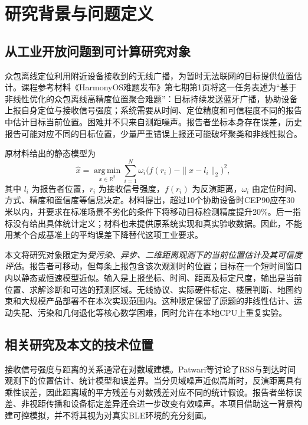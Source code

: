 \section{研究背景与问题定义}
\label{sec:background}

\subsection{从工业开放问题到可计算研究对象}

众包离线定位利用附近设备接收到的无线广播，为暂时无法联网的目标提供位置估计。课程参考材料《HarmonyOS难题发布》第七期第1页将这一任务表述为“基于非线性优化的众包离线高精度位置聚合难题”\cite{huaweiHarmonyChallenge7}：目标持续发送蓝牙广播，协助设备上报自身定位与接收信号强度；系统需要从时间、定位精度和可信程度不同的报告中估计目标当前位置。困难并不只来自测距噪声。报告者坐标本身存在误差，历史报告可能对应不同的目标位置，少量严重错误上报还可能破坏聚类和非线性拟合。

原材料给出的静态模型为
\begin{equation}
  \widehat x=\operatorname*{arg\,min}_{x\in\mathbb R^2}
  \sum_{i=1}^{N}\omega_i\bigl(f(r_i)-\|x-l_i\|_2\bigr)^2,
  \label{eq:original-problem}
\end{equation}
其中 $l_i$ 为报告者位置，$r_i$ 为接收信号强度，$f(r_i)$ 为反演距离，$\omega_i$ 由定位时间、方式、精度和置信度等信息决定。材料提出，超过10个协助设备时CEP90应在30米以内，并要求在标准场景不劣化的条件下将移动目标检测精度提升20\%。后一指标没有给出具体统计定义；材料也未提供原系统实现和真实验收数据。因此，不能用某个合成基准上的平均误差下降替代这项工业要求。

本文将研究对象限定为\emph{受污染、异步、二维距离观测下的当前位置估计及其可信度评估}。报告者可移动，但每条上报包含该次观测时的位置；目标在一个短时间窗口内以静态或恒速模型近似。输入是上报坐标、时间、距离及标定尺度，输出是当前位置、求解诊断和可选的预测区域。无线协议、实际硬件标定、楼层判断、地图约束和大规模产品部署不在本次实现范围内。这种限定保留了原题的非线性估计、运动失配、污染和几何退化等核心数学困难，同时允许在本地CPU上重复实验。

\subsection{相关研究及本文的技术位置}

接收信号强度与距离的关系通常在对数域建模。Patwari等讨论了RSS与到达时间观测下的位置估计、统计模型和误差界\cite{patwari2003relative}。当分贝域噪声近似高斯时，反演距离具有乘性误差，因此距离域的平方残差与对数残差对应不同的统计假设。报告者坐标误差、非视距传播和设备标定差异还会进一步改变有效噪声。本项目借助这一背景构建可控模拟，并不将其视为对真实BLE环境的充分刻画。

